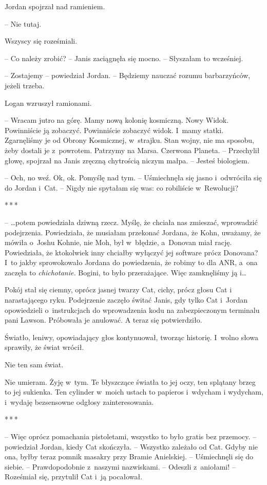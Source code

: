 \documentclass[oneside,polish,11pt,sfheadings]{mwbk}
\newcommand{\threeast}{\bigskip\par\centerline{*\,*\,*}\medskip\par}%
\begin{document}
Jordan spojrzał nad ramieniem. 

-- Nie tutaj.

Wszyscy się roześmiali.

-- Co należy zrobić? -- Janis zaciągnęła się mocno. -- Słyszałam to
wcześniej.

-- Zostajemy -- powiedział Jordan. -- Będziemy nauczać rozumu barbarzyńców,
jeżeli trzeba.

Logan wzruszył ramionami. 

-- Wracam jutro na górę. Mamy nową kolonię
kosmiczną. Nowy Widok. Powinniście ją zobaczyć. Powinniście zobaczyć
widok. I~mamy statki. Zgarnęliśmy je od Obrony Kosmicznej, w~strajku.
Stan wojny, nie ma sposobu, żeby dostali je z~powrotem. Patrzymy na
Marsa. Czerwona Planeta. -- Przechylił głowę, spojrzał na Janis zręczną
chytrością niczym małpa. -- Jesteś biologiem.

-- Och, no weź. Ok, ok. Pomyślę nad tym. -- Uśmiechnęła się jasno i~odwróciła się do Jordan i~Cat. -- Nigdy nie spytałam się was: co
robiliście w~Rewolucji?

  \threeast 

-- \ldots potem powiedziała dziwną rzecz. Myślę, że chciała nas zmieszać,
wprowadzić podejrzenia. Powiedziała, że musiałam przekonać Jordana, że
Kohn, uważamy, że mówiła o~Joshu Kohnie, nie Moh, był w~błędzie, a~Donovan miał rację. Powiedziała, że ktokolwiek inny chciałby wyłączyć
jej software prócz Donovana? I~to jakby sprowokowało Jordana do
powiedzenia, że robimy to dla ANR, a~ona zaczęła to \emph{chichotanie.}
Bogini, to było przerażające. Więc zamknęliśmy ją i\ldots

Pokój stał się ciemny, oprócz jasnej twarzy Cat, cichy, prócz głosu Cat
i narastającego ryku. Podejrzenie zaczęło świtać Janis, gdy tylko Cat i~Jordan opowiedzieli o~instrukcjach do wprowadzenia kodu na
zabezpieczonym terminalu pani Lawson. Próbowała je anulować. A teraz się
potwierdziło.

Światło, leniwy, opowiadający głos kontynuował, tworząc historię. I~wolno słowa sprawiły, że świat wrócił.

Nie ten sam świat.

Nie umieram. Żyję w~tym. Te błyszczące światła to jej oczy, ten splątany
brzeg to jej sukienka. Ten cylinder w~moich ustach to papieros i~wdycham
i wydycham, i~wydaję bezsensowne odgłosy zainteresowania.
  \threeast 

-- Więc oprócz pomachania pistoletami, wszystko to było gratis bez
przemocy. -- powiedział Jordan, kiedy Cat skończyła. -- Wszystko zależało
od Cat. Gdyby nie ona, byłby teraz pomnik masakry przy Bramie
Anielskiej. -- Uśmiechnęli się do siebie. -- Prawdopodobnie z~naszymi
nazwiskami. -- Odeszli z~aniołami! -- Roześmiał się, przytulił Cat i~ją
pocałował.
\end{document}
